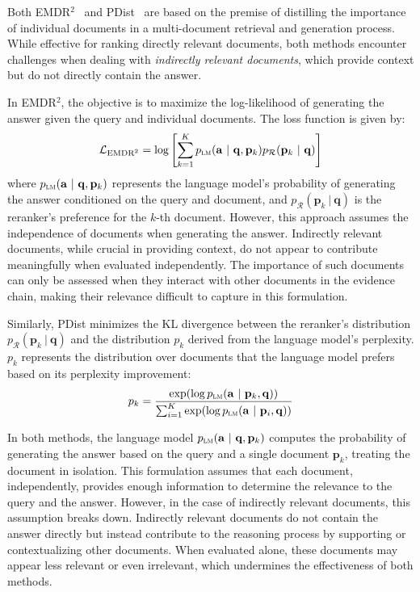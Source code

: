 Both EMDR$^2$~\cite{DBLP:conf/nips/SachanRHDY21, DBLP:conf/naacl/ShiMYS0LZY24, DBLP:conf/iclr/Lin0CSL00KSLZY24} and PDist~\cite{DBLP:journals/jmlr/IzacardLLHPSDJRG23, DBLP:conf/naacl/GlassRCNCG22} are based on the premise of distilling the importance of individual documents in a multi-document retrieval and generation process. While effective for ranking directly relevant documents, both methods encounter challenges when dealing with \textit{indirectly relevant documents}, which provide context but do not directly contain the answer. 

In EMDR$^2$, the objective is to maximize the log-likelihood of generating the answer given the query and individual documents. The loss function is given by:
\[
\mathcal{L}_{\text{EMDR}^2} = \log \left[ \sum_{k=1}^K p_{\textsc{lm}}(\mathbf{a} \ | \ \mathbf{q}, \mathbf{p}_k) p_{\mathcal{R}}(\mathbf{p}_k \ | \ \mathbf{q}) \right]
\]
where \( p_{\textsc{lm}}(\mathbf{a} \ | \ \mathbf{q}, \mathbf{p}_k) \) represents the language model’s probability of generating the answer conditioned on the query and document, and \( p_{\mathcal{R}}(\mathbf{p}_k \ | \ \mathbf{q}) \) is the reranker's preference for the \(k\)-th document. However, this approach assumes the independence of documents when generating the answer. Indirectly relevant documents, while crucial in providing context, do not appear to contribute meaningfully when evaluated independently. The importance of such documents can only be assessed when they interact with other documents in the evidence chain, making their relevance difficult to capture in this formulation.

Similarly, PDist minimizes the KL divergence between the reranker's distribution \(p_{\mathcal{R}}(\mathbf{p}_k \ | \ \mathbf{q})\) and the distribution \( p_k \) derived from the language model's perplexity. \( p_k \) represents the distribution over documents that the language model prefers based on its perplexity improvement:
\[
p_k = \frac{\exp(\log p_{\textsc{lm}} (\mathbf{a} \ | \ \mathbf{p}_k, \mathbf{q}))}{\sum_{i=1}^K \exp ( \log p_{\textsc{lm}} (\mathbf{a} \ | \ \mathbf{p}_i, \mathbf{q}))}
\]

In both methods, the language model \( p_{\textsc{lm}}(\mathbf{a} \ | \ \mathbf{q}, \mathbf{p}_k) \) computes the probability of generating the answer based on the query and a single document \( \mathbf{p}_k \), treating the document in isolation. This formulation assumes that each document, independently, provides enough information to determine the relevance to the query and the answer. However, in the case of indirectly relevant documents, this assumption breaks down. Indirectly relevant documents do not contain the answer directly but instead contribute to the reasoning process by supporting or contextualizing other documents. When evaluated alone, these documents may appear less relevant or even irrelevant, which undermines the effectiveness of both methods.

